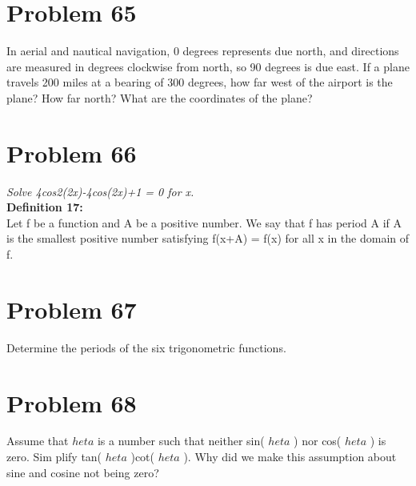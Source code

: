 \documentclass[11pt]{article} %
\begin{document}
\newpage \section*{Problem 65} In aerial and nautical navigation, 0 degrees represents due north, and directions are measured in degrees clockwise from north, so 90 degrees is due east. If a plane travels 200 miles at a bearing of 300 degrees, how far west of the airport is the plane? How far north? What are the coordinates of the plane? 
\newpage \section*{Problem 66} 
\textit{Solve 4cos2(2x)-4cos(2x)+1 = 0 for x.}
\\ \textbf{Definition 17:} 
\\Let f be a function and A be a positive number. We say that f has period A if A is the smallest positive number satisfying f(x+A) = f(x) for all x in the domain of f.

\newpage \section*{Problem 67} Determine the periods of the six trigonometric functions.

\newpage \section*{Problem 68} Assume that
$	heta$
is a number such that neither sin( $	heta$ ) nor cos( $	heta$ ) is zero. Sim
plify tan( $	heta$ )cot( $	heta$ ). Why did we make this assumption about sine and cosine not being zero?
\end{document}

